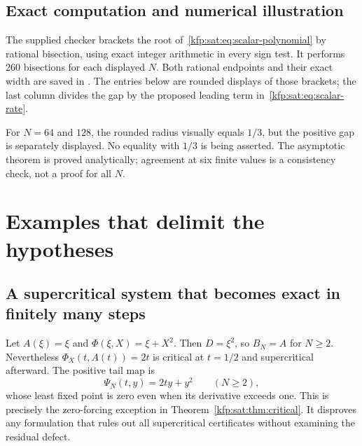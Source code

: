 \documentclass[11pt,a4paper]{article}
\theoremstyle{definition}
\theoremstyle{remark}
\begin{document}
\subsection{Exact computation and numerical illustration}
The supplied checker brackets the root of~\eqref{kfp:sat:eq:scalar-polynomial}
by rational bisection, using exact integer arithmetic in every sign test.
It performs $260$ bisections for each displayed $N$. Both rational
endpoints and their exact width are saved in
. The entries below are rounded displays
of those brackets; the last column divides the gap by the proposed leading
term in~\eqref{kfp:sat:eq:scalar-rate}.

\begin{table}[htbp]
\centering\small

\caption{The scalar radius approaches its barrier at the predicted half-rate.
The exact brackets, not the rounded decimal display, are the certificates.}
\label{kfp:sat:tab:scalar}
\end{table}

For $N=64$ and $128$, the rounded radius visually equals $1/3$, but the
positive gap is separately displayed. No equality with $1/3$ is being
asserted. The asymptotic theorem is proved analytically; agreement at six
finite values is a consistency check, not a proof for all $N$.

\section{Examples that delimit the hypotheses}
\label{kfp:sat:sec:exceptions}

\subsection{A supercritical system that becomes exact in finitely many steps}
Let $A(\xi)=\xi$ and $\Phi(\xi,X)=\xi+X^2$. Then $D=\xi^2$, so $B_N=A$ for
$N\ge2$. Nevertheless $\Phi_X(t,A(t))=2t$ is critical at $t=1/2$ and
supercritical afterward. The positive tail map is
\[
 \Psi_N(t,y)=2ty+y^2\qquad(N\ge2),
\]
whose least fixed point is zero even when its derivative exceeds one.
This is precisely the zero-forcing exception in
Theorem~\ref{kfp:sat:thm:critical}. It disproves any formulation that rules out
all supercritical certificates without examining the residual defect.
\end{document}
